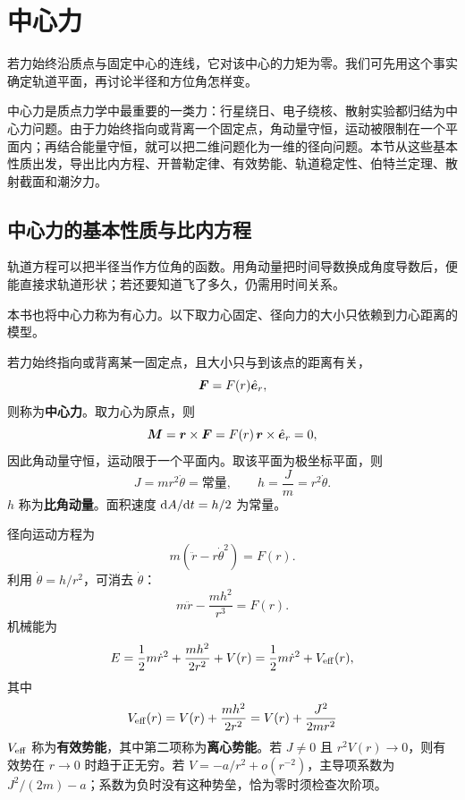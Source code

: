 \section{中心力}\label{sec:central}

若力始终沿质点与固定中心的连线，它对该中心的力矩为零。我们可先用这个事实确定轨道平面，再讨论半径和方位角怎样变。

中心力是质点力学中最重要的一类力：行星绕日、电子绕核、散射实验都归结为中心力问题。由于力始终指向或背离一个固定点，角动量守恒，运动被限制在一个平面内；再结合能量守恒，就可以把二维问题化为一维的径向问题。本节从这些基本性质出发，导出比内方程、开普勒定律、有效势能、轨道稳定性、伯特兰定理、散射截面和潮汐力。

\subsection{中心力的基本性质与比内方程}

轨道方程可以把半径当作方位角的函数。用角动量把时间导数换成角度导数后，便能直接求轨道形状；若还要知道飞了多久，仍需用时间关系。

本书也将中心力称为有心力。以下取力心固定、径向力的大小只依赖到力心距离的模型。

若力始终指向或背离某一固定点，且大小只与到该点的距离有关，
\begin{equation}
\boldsymbol{F}=F(r)\hat{\boldsymbol{e}}_r,
\label{eq:central-force}
\end{equation}
则称为\textbf{中心力}。取力心为原点，则
\begin{equation}
\boldsymbol{M}=\boldsymbol{r}\times\boldsymbol{F}=F(r)\,\boldsymbol{r}\times\hat{\boldsymbol{e}}_r=0,
\end{equation}
因此角动量守恒，运动限于一个平面内。取该平面为极坐标平面，则
\begin{equation}
J=mr^2\dot\theta=\text{常量},\qquad
h=\frac{J}{m}=r^2\dot\theta .
\label{eq:areal-constant}
\end{equation}
$h$ 称为\textbf{比角动量}。面积速度 ${\rm d}A/{\rm d}t=h/2$ 为常量。

径向运动方程为
\begin{equation}
m\left(\ddot r-r\dot\theta^2\right)=F(r).
\label{eq:radial-eom}
\end{equation}
利用 $\dot\theta=h/r^2$，可消去 $\dot\theta$：
\begin{equation}
m\ddot r-\frac{mh^2}{r^3}=F(r).
\label{eq:radial-eom2}
\end{equation}
机械能为
\begin{equation}
E=\frac12m\dot r^2+\frac{mh^2}{2r^2}+V(r)
=\frac12m\dot r^2+V_{\rm eff}(r),
\label{eq:central-energy}
\end{equation}
其中
\begin{equation}
V_{\rm eff}(r)=V(r)+\frac{mh^2}{2r^2}
=V(r)+\frac{J^2}{2mr^2}
\label{eq:effective-potential}
\end{equation}
$V_{\rm eff}$ 称为\textbf{有效势能}，其中第二项称为\textbf{离心势能}。若 $J\ne0$ 且 $r^2V(r)\to0$，则有效势在 $r\to0$ 时趋于正无穷。若 $V=-a/r^2+o(r^{-2})$，主导项系数为 $J^2/(2m)-a$；系数为负时没有这种势垒，恰为零时须检查次阶项。

